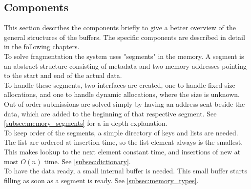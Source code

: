 \subsection{Components}
This section describes the components briefly to give a better overview of the
general structures of the buffers. The specific components are described in
detail in the following chapters.\\
To solve fragmentation the system uses "segments" in the memory.
A segment is an abstract structure consisting of metadata and two memory
addresses pointing to the start and end of the actual data.\\
To handle these segments, two interfaces are created, one to handle fixed size
allocations, and one to handle dynamic allocations, where the size is unknown.
Out-of-order submissions are solved simply by having an address sent beside the
data, which are added to the beginning of that respective segment.
See \autoref{subsec:memory_segments} for a in depth explanation.
\\
To keep order of the segments, a simple directory of keys and lists
are needed. The list are ordered at insertion time, so the fist element
always is the smallest. This makes lookup to the next element constant time, and
insertions of new at most $O(n)$ time. See \autoref{subsec:dictionary}.
\\
To have the data ready, a small internal buffer is needed. This small buffer
starts filling as soon as a segment is ready.
See \autoref{subsec:memory_types}.

